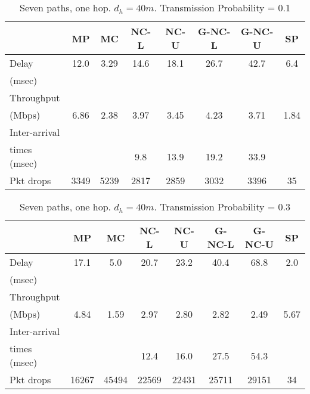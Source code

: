 \documentclass[journal, onecolumn, 12pt]{IEEEtran}
\begin{document}
\begin{table}[hb]
\begin{center}
\scriptsize
\begin{tabular}{|l|c|c|c|c|c|c|c|}
\hline
~                                   & MP & MC & NC-L & NC-U & G-NC-L & G-NC-U & SP \\ \hline
Delay           &  12.0 & 3.29 & 14.6 & 18.1 & 26.7 & 42.7 & 6.4\\
(msec)           &   &  &   &   &   &  &  \\ \hline
Throughput             & ~  & ~  & ~    & ~    & ~           & ~           & ~  \\
(Mbps)                 & 6.86 & 2.38  & 3.97 & 3.45 & 4.23 & 3.71 & 1.84 \\ \hline
Inter-arrival             & ~  & ~  & ~    & ~    & ~           & ~           & ~  \\
times (msec)   &   &   & 9.8 & 13.9 & 19.2 & 33.9 &  \\ \hline
Pkt drops       & 3349 & 5239 &  2817 & 2859  & 3032 & 3396 & 35 \\ \hline
\end{tabular}
\end{center}
\caption {Seven paths, one hop. $d_{h}=40m$. Transmission Probability = 0.1}
\label{tab:sim_topol_5_0.1}
\end{table}

\begin{table}[hb]
\begin{center}
\scriptsize
\begin{tabular}{|l|c|c|c|c|c|c|c|}
\hline
~                                   & MP & MC & NC-L & NC-U & G-NC-L & G-NC-U & SP \\ \hline
Delay           &  17.1 &  5.0 & 20.7 & 23.2 & 40.4 & 68.8 & 2.0\\
(msec)           &   &  &   &   &   &  &  \\ \hline
Throughput             & ~  & ~  & ~    & ~    & ~           & ~           & ~  \\
(Mbps)                 & 4.84 & 1.59 & 2.97 & 2.80 & 2.82 & 2.49 & 5.67\\ \hline
Inter-arrival             & ~  & ~  & ~    & ~    & ~           & ~           & ~  \\
times (msec)   &   &   & 12.4 & 16.0 & 27.5 & 54.3 &  \\ \hline
Pkt drops       & 16267 & 45494 &  22569 & 22431  & 25711 & 29151 & 34 \\ \hline
\end{tabular}
\end{center}
\caption {Seven paths, one hop. $d_{h}=40m$. Transmission Probability = 0.3}
\label{tab:sim_topol_5_0.3}
\end{table}
\end{document}
